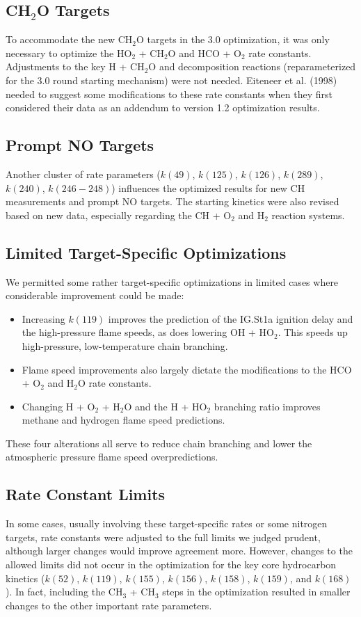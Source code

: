\subsection*{CH$_2$O Targets}
To accommodate the new CH$_2$O targets in the 3.0 optimization, it was only necessary to optimize the HO$_2$ + CH$_2$O and HCO + O$_2$ rate constants. Adjustments to the key H + CH$_2$O and decomposition reactions (reparameterized for the 3.0 round starting mechanism) were not needed. Eiteneer et al. (1998) needed to suggest some modifications to these rate constants when they first considered their data as an addendum to version 1.2 optimization results.

\subsection*{Prompt NO Targets}
Another cluster of rate parameters ($k(49)$, $k(125)$, $k(126)$, $k(289)$, $k(240)$, $k(246-248)$) influences the optimized results for new CH measurements and prompt NO targets. The starting kinetics were also revised based on new data, especially regarding the CH + O$_2$ and H$_2$ reaction systems.

\subsection*{Limited Target-Specific Optimizations}
We permitted some rather target-specific optimizations in limited cases where considerable improvement could be made:
\begin{itemize}
    \item Increasing $k(119)$ improves the prediction of the IG.St1a ignition delay and the high-pressure flame speeds, as does lowering OH + HO$_2$. This speeds up high-pressure, low-temperature chain branching.
    \item Flame speed improvements also largely dictate the modifications to the HCO + O$_2$ and H$_2$O rate constants.
    \item Changing H + O$_2$ + H$_2$O and the H + HO$_2$ branching ratio improves methane and hydrogen flame speed predictions.
\end{itemize}
These four alterations all serve to reduce chain branching and lower the atmospheric pressure flame speed overpredictions.

\subsection*{Rate Constant Limits}
In some cases, usually involving these target-specific rates or some nitrogen targets, rate constants were adjusted to the full limits we judged prudent, although larger changes would improve agreement more. However, changes to the allowed limits did not occur in the optimization for the key core hydrocarbon kinetics ($k(52)$, $k(119)$, $k(155)$, $k(156)$, $k(158)$, $k(159)$, and $k(168)$). In fact, including the CH$_3$ + CH$_3$ steps in the optimization resulted in smaller changes to the other important rate parameters.


